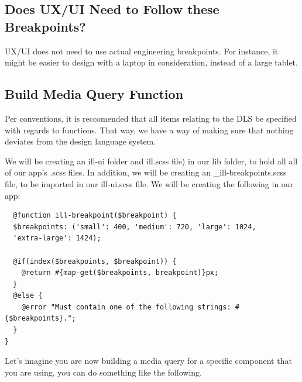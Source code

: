 \subsection{ Does UX/UI Need to Follow these Breakpoints? }
UX/UI does not need to use actual engineering breakpoints. For instance,
it might be easier to design with a laptop in consideration, instead of a large
tablet.

\subsection{ Build Media Query Function }
Per conventions, it is reccomended that all items relating to the DLS be
specified with regards to functions. That way, we have a way of making sure
that nothing deviates from the design language system.

We will be creating an ill-ui folder and ill.scss file) in our lib folder, to
hold all all of our app's .scss files. In addition, we will be creating an
 \_ill-breakpoints.scss file, to be imported in our ill-ui.scss file. We will be
creating the following in our app:

\begin{lstlisting}
  @function ill-breakpoint($breakpoint) {
  $breakpoints: ('small': 400, 'medium': 720, 'large': 1024,
  'extra-large': 1424);

  @if(index($breakpoints, $breakpoint)) {
    @return #{map-get($breakpoints, breakpoint)}px;
  }
  @else {
    @error "Must contain one of the following strings: #{$breakpoints}.";
  }
}
\end{lstlisting}

Let's imagine you are now building a media query for a specific component
that you are using, you can do something like the following.
